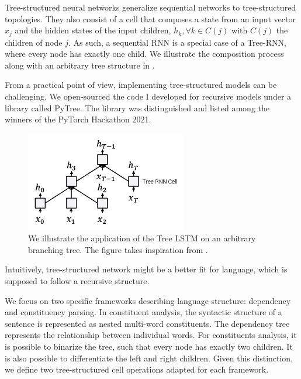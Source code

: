 Tree-structured neural networks generalize sequential networks to tree-structured topologies.  They also consist of a cell that composes a state from an input vector $x_j$ and the hidden states of the input children, $h_k, \forall k \in C(j)$ with $C(j)$ the children of node $j$. As such, a sequential RNN is a special case of a Tree-RNN, where every node has exactly one child. We illustrate the composition process along with an arbitrary tree structure in .

From a practical point of view, implementing tree-structured models can be challenging. We open-sourced the code I developed for recursive models under a library called PyTree. The library was distinguished and listed among the winners of the PyTorch Hackathon 2021.

\begin{figure}[!ht]
	\includegraphics[width=7cm]{images/tree-lstm.png}
	\caption[Tree LSTM]{We illustrate the application of the Tree LSTM on an arbitrary branching tree. The figure takes inspiration from \textcite{tai_15}.}
\end{figure}

Intuitively, tree-structured network might be a better fit for language, which is supposed to follow a recursive structure. 

We focus on two specific frameworks describing language structure: dependency and constituency parsing. In constituent analysis, the syntactic structure of a sentence is represented as nested multi-word constituents. The dependency tree represents the relationship between individual words. For constituents analysis, it is possible to binarize the tree, such that every node has exactly two children. It is also possible to differentiate the left and right children. Given this distinction, we define two tree-structured cell operations adapted for each framework.

